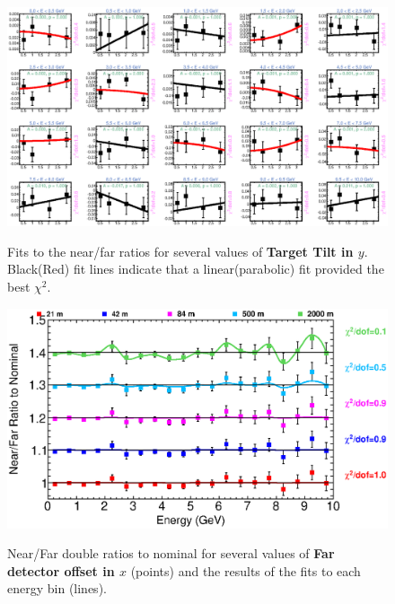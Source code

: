 \begin{figure}[ht]
  \begin{center}
    {\includegraphics[width=5.0in]{figures/TargetYTilt_nof_fits.eps}}
  \end{center}
\caption{ Fits to the near/far ratios for several values of {\bf Target Tilt in $y$}. Black(Red) fit lines indicate that a linear(parabolic) fit provided the best $\chi^2$. }
\end{figure}


\begin{figure}[ht]
  \begin{center}
    {\includegraphics[width=6.0in]{figures/LBNEFDX_nof_summary.eps}}
  \end{center}
\caption{ Near/Far double ratios to nominal for several values of {\bf Far detector offset in $x$} (points) and the results of the fits to each energy bin (lines).}
\end{figure}

